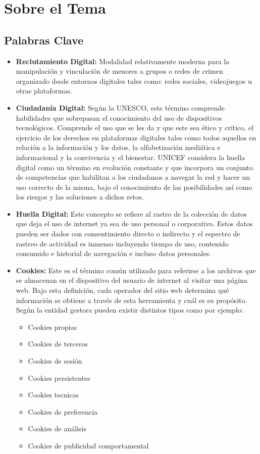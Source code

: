 \section{Sobre el Tema}

\subsection{Palabras Clave}

\begin{itemize}
  \item \textbf{Reclutamiento Digital:} Modalidad relativamente moderna para la manipulación y vinculación de menores a grupos o redes de crimen organizado desde entornos digitales tales como: redes sociales, videojuegos u otras plataformas.
  \item \textbf{Ciudadanía Digital:} Según la UNESCO, este término comprende habilidades que sobrepasan el conocimiento del uso de dispositivos tecnológicos. Comprende el uso que se les da y que este sea ético y crítico, el ejercicio de los derechos en plataformas digitales tales como todos aquellos en relación a la información y los datos, la alfabetización mediática e informacional y la convivencia y el bienestar. UNICEF considera la huella digital como un término en evolución constante y que incorpora un conjunto de competencias que habilitan a los ciudadanos a navegar la red y hacer un uso correcto de la misma, bajo el conocimiento de las posibilidades así como los riesgos y las soluciones a dichos retos.
  \item \textbf{Huella Digital:} Este concepto se refiere al rastro de la colección de datos que deja el uso de internet ya sea de uso personal o corporativo. Estos datos pueden ser dados con consentimiento directo o indirecto y el espectro de rastreo de actividad es inmenso incluyendo tiempo de uso, contenido consumido e historial de navegación e incluso datos personales.
  \item \textbf{Cookies:} Este es el término común utilizado para referirse a los archivos que se almacenan en el dispositivo del usuario de internet al visitar una página web. Bajo esta definición, cada operador del sitio web determina qué información se obtiene a través de esta herramienta y cuál es su propósito. Según la entidad gestora pueden existir distintos tipos como por ejemplo:
  \begin{itemize}
    \item Cookies propias
    \item Cookies de terceros
    \item Cookies de sesión
    \item Cookies persistentes
    \item Cookies tecnicas
    \item Cookies de preferencia
    \item Cookies de análisis
    \item Cookies de publicidad comportamental
  \end{itemize}
\end{itemize}

